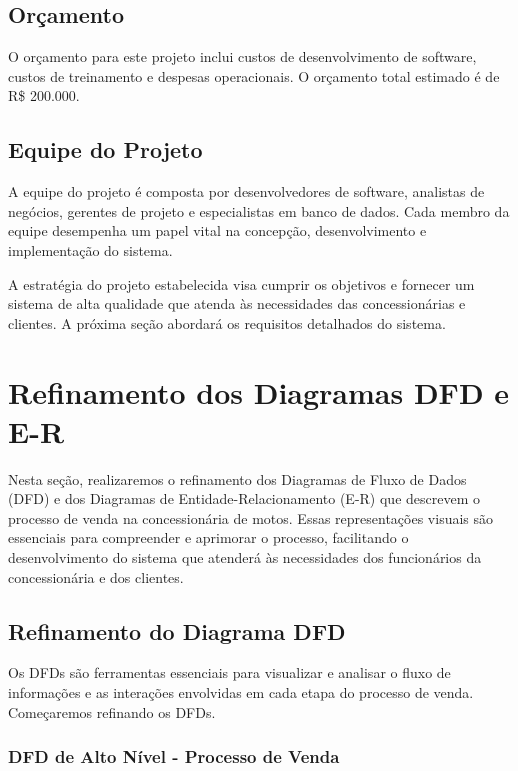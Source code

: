 \subsection{Orçamento}

O orçamento para este projeto inclui custos de desenvolvimento de software, custos de treinamento e despesas operacionais. O orçamento total estimado é de R\$ 200.000.

\subsection{Equipe do Projeto}

A equipe do projeto é composta por desenvolvedores de software, analistas de negócios, gerentes de projeto e especialistas em banco de dados. Cada membro da equipe desempenha um papel vital na concepção, desenvolvimento e implementação do sistema.

A estratégia do projeto estabelecida visa cumprir os objetivos e fornecer um sistema de alta qualidade que atenda às necessidades das concessionárias e clientes. A próxima seção abordará os requisitos detalhados do sistema.

\section{Refinamento dos Diagramas DFD e E-R}

Nesta seção, realizaremos o refinamento dos Diagramas de Fluxo de Dados (DFD) e dos Diagramas de Entidade-Relacionamento (E-R) que descrevem o processo de venda na concessionária de motos. Essas representações visuais são essenciais para compreender e aprimorar o processo, facilitando o desenvolvimento do sistema que atenderá às necessidades dos funcionários da concessionária e dos clientes.

\subsection{Refinamento do Diagrama DFD}

Os DFDs são ferramentas essenciais para visualizar e analisar o fluxo de informações e as interações envolvidas em cada etapa do processo de venda. Começaremos refinando os DFDs.




\subsubsection{DFD de Alto Nível - Processo de Venda}

